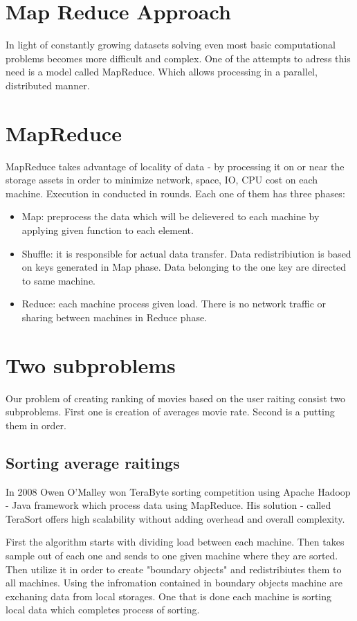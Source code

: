 \section{Map Reduce Approach}
In light of constantly growing datasets solving even 
most basic computational problems becomes more difficult and complex.
One of the attempts to adress this need is a model called MapReduce.
Which allows processing in a parallel, distributed manner.

\section{MapReduce}
MapReduce takes advantage of locality of data - by processing it on 
or near the storage assets in order to minimize network, space, IO, CPU cost on each machine.
Execution in conducted in rounds. Each one of them has three phases:

\begin{itemize}
\item Map: preprocess the data which will be delievered to each machine by applying 
given function to each element. 
\item Shuffle: it is responsible for actual data transfer. Data redistribiution is based on 
keys generated in Map phase. Data belonging to the one key are directed to same machine. 
\item Reduce: each machine process given load. There is no network traffic or sharing between machines
in Reduce phase.
\end{itemize}

\section{Two subproblems}
Our problem of creating ranking of movies based on the user raiting 
consist two subproblems. First one is creation of averages movie rate.
Second is a putting them in order. 

\subsection{Sorting average raitings}
In 2008 Owen O'Malley won TeraByte sorting competition using Apache Hadoop
- Java framework which process data using MapReduce. His solution - called TeraSort offers
high scalability without adding overhead and overall complexity.

First the algorithm starts with dividing load between each machine. Then takes sample 
out of each one and sends to one given machine where they are sorted.
Then utilize it in order to create "boundary objects" and redistribiutes them
to all machines. Using the infromation contained in boundary objects 
machine are exchaning data from local storages.
One that is done each machine is sorting local data which completes process of sorting.

